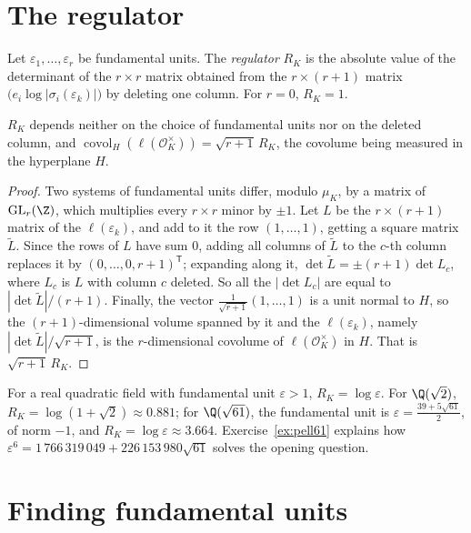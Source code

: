 \section{The regulator}

\begin{definition}
Let $\varepsilon_1,\dots,\varepsilon_r$ be fundamental units. The \emph{regulator} $R_K$ is the absolute value of the
determinant of the $r\times r$ matrix obtained from the $r\times(r+1)$ matrix $\bigl(e_i\log|\sigma_i(\varepsilon_k)|
\bigr)$ by deleting one column. For $r=0$, $R_K=1$.
\end{definition}

\begin{proposition}\label{prop:regwelldef}
$R_K$ depends neither on the choice of fundamental units nor on the deleted column, and
$\operatorname{covol}_H(\ell(\mathcal O_K^\times))=\sqrt{r+1}\,R_K$, the covolume being measured in the hyperplane $H$.
\end{proposition}
\begin{proof}
Two systems of fundamental units differ, modulo $\mu_K$, by a matrix of $\mathrm{GL}_r(\Z)$, which multiplies every
$r\times r$ minor by $\pm1$. Let $L$ be the $r\times(r+1)$ matrix of the $\ell(\varepsilon_k)$, and add to it the row
$(1,\dots,1)$, getting a square matrix $\tilde L$. Since the rows of $L$ have sum $0$, adding all columns of $\tilde L$ to
the $c$-th column replaces it by $(0,\dots,0,r+1)^{\mathsf T}$; expanding along it, $\det\tilde L=\pm(r+1)\det L_c$, where
$L_c$ is $L$ with column $c$ deleted. So all the $|\det L_c|$ are equal to $|\det\tilde L|/(r+1)$. Finally, the vector
$\frac1{\sqrt{r+1}}(1,\dots,1)$ is a unit normal to $H$, so the $(r+1)$-dimensional volume spanned by it and the
$\ell(\varepsilon_k)$, namely $|\det\tilde L|/\sqrt{r+1}$, is the $r$-dimensional covolume of $\ell(\mathcal O_K^\times)$ in
$H$. That is $\sqrt{r+1}\,R_K$.
\end{proof}

For a real quadratic field with fundamental unit $\varepsilon>1$, $R_K=\log\varepsilon$. For $\Q(\sqrt2)$, $R_K=\log(1+\sqrt2)
\approx0.881$; for $\Q(\sqrt{61})$, the fundamental unit is $\varepsilon=\frac{39+5\sqrt{61}}2$, of norm $-1$, and
$R_K=\log\varepsilon\approx3.664$. Exercise~\ref{ex:pell61} explains how $\varepsilon^6=1\,766\,319\,049+226\,153\,980\sqrt{61}$ solves the
opening question.

\section{Finding fundamental units}

